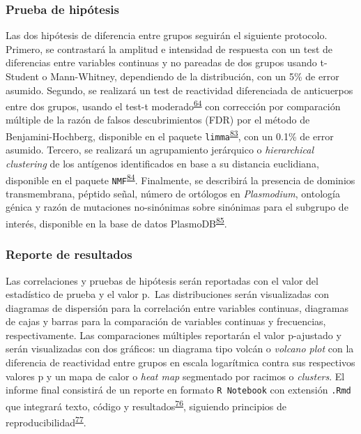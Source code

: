 \documentclass[]{article}
\begin{document}
\subsubsection{Prueba de hipótesis}\label{prueba-de-hipotesis}

Las dos hipótesis de diferencia entre grupos seguirán el siguiente
protocolo. Primero, se contrastará la amplitud e intensidad de respuesta
con un test de diferencias entre variables continuas y no pareadas de
dos grupos usando t-Student o Mann-Whitney, dependiendo de la
distribución, con un 5\% de error asumido. Segundo, se realizará un test
de reactividad diferenciada de anticuerpos entre dos grupos, usando el
test-t
moderado\textsuperscript{\protect\hyperlink{ref-smyth2004ebayes}{64}}
con corrección por comparación múltiple de la razón de falsos
descubrimientos (FDR) por el método de Benjamini-Hochberg, disponible en
el paquete
\texttt{limma}\textsuperscript{\protect\hyperlink{ref-limma}{83}}, con
un 0.1\% de error asumido. Tercero, se realizará un agrupamiento
jerárquico o \emph{hierarchical clustering} de los antígenos
identificados en base a su distancia euclidiana, disponible en el
paquete
\texttt{NMF}\textsuperscript{\protect\hyperlink{ref-Gaujoux2010NMF}{84}}.
Finalmente, se describirá la presencia de dominios transmembrana,
péptido señal, número de ortólogos en \emph{Plasmodium}, ontología
génica y razón de mutaciones no-sinónimas sobre sinónimas para el
subgrupo de interés, disponible en la base de datos
PlasmoDB\textsuperscript{\protect\hyperlink{ref-plasmodb}{85}}.

\subsubsection{Reporte de resultados}\label{reporte-de-resultados}

Las correlaciones y pruebas de hipótesis serán reportadas con el valor
del estadístico de prueba y el valor p.~Las distribuciones serán
visualizadas con diagramas de dispersión para la correlación entre
variables continuas, diagramas de cajas y barras para la comparación de
variables continuas y frecuencias, respectivamente. Las comparaciones
múltiples reportarán el valor p-ajustado y serán visualizadas con dos
gráficos: un diagrama tipo volcán o \emph{volcano plot} con la
diferencia de reactividad entre grupos en escala logarítmica contra sus
respectivos valores p y un mapa de calor o \emph{heat map} segmentado
por racimos o \emph{clusters}. El informe final consistirá de un reporte
en formato \texttt{R\ Notebook} con extensión \texttt{.Rmd} que
integrará texto, código y
resultados\textsuperscript{\protect\hyperlink{ref-knitr}{76}}, siguiendo
principios de
reproducibilidad\textsuperscript{\protect\hyperlink{ref-CienciaReproducible2016}{77}}.
\end{document}
